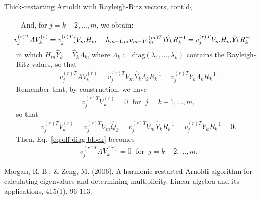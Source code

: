 \documentclass[t,usepdftitle=false]{beamer}
\begin{document}
\begin{frame}{Thick-restarting Arnoldi with Rayleigh-Ritz vectors, cont'd\textsubscript{7}}
\begin{itemize}
\item[-] And, for $j=k+2,\dots,m$, we obtain:
\begin{align*}
\hspace{-.5cm}
v_j^{(r)T}AV_k^{(r)}
=v_{j}^{(r)T}(V_mH_m+h_{m+1,m}v_{m+1}e_m^{(m)T})\hat{Y}_kR_k^{-1}
=v_{j}^{(r)T}V_mH_m\hat{Y}_kR_k^{-1}
\end{align*}
in which $H_m\hat{Y}_k=\hat{Y}_k\Lambda_k$, where $\Lambda_k:=\text{diag}(\lambda_1,\dots,\lambda_k)$ contains the Rayleigh-Ritz values, so that
\begin{align}\label{eq:off-diag-block}
v_j^{(r)T}AV_k^{(r)}
=v_{j}^{(r)T}V_m\hat{Y}_k\Lambda_kR_k^{-1}
=v_{j}^{(r)T}Y_k\Lambda_kR_k^{-1}.
\end{align}
Remember that, by construction, we have
\begin{align*}
v_j^{(r)T}V_k^{(r)}=0\;\text{ for }\;j=k+1,\dots,m,
\end{align*}
so that
\begin{align*}
v_j^{(r)T}V_k^{(r)}
=v_j^{(r)T}V_m\hat{Q}_k
=v_j^{(r)T}V_m\hat{Y}_kR_k^{-1}
=v_j^{(r)T}Y_kR_k^{-1}=0.
\end{align*}
Then, Eq.~\eqref{eq:off-diag-block} becomes
\begin{align*}
v_j^{(r)T}AV_k^{(r)}=0
\;\text{ for }\;
j=k+2,\dots,m.
\end{align*}
\end{itemize}\smallskip
\tiny{Morgan, R. B., \& Zeng, M. (2006). A harmonic restarted Arnoldi algorithm for calculating eigenvalues and determining
multiplicity. Linear algebra and its applications, 415(1), 96-113.}
\end{frame}
\end{document}
